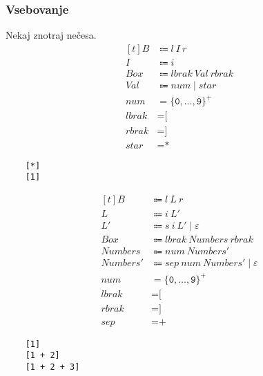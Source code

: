 \documentclass{report}
\newcommand{\Null}{\varepsilon}
\newcommand{\Char}[1]{\texttt{#1}}
\newcommand{\Spc}{\ }
\newcommand{\Union}{\mathrel{|}}
\newcommand{\KleenePlus}[1]{#1^+}
\newcommand{\Arrow}{\Coloneq}
\newcommand{\NT}[1]{{#1}}
\newcommand{\T}[1]{{#1}}
\begin{document}
    \subsubsection{Vsebovanje}
    Nekaj znotraj nečesa.
    \begin{equation*}
      \begin{aligned}[t]
        \NT{B} &\Arrow \T{l} \Spc \T{I} \Spc \T{r}\\
        \NT{I} &\Arrow \T{i}\\[1em]
        \NT{Box} &\Arrow \T{lbrak} \Spc \NT{Val} \Spc \T{rbrak}\\
        \NT{Val} &\Arrow \T{num} \Union \T{star}\\[1em]
        \T{num} &= \KleenePlus{\{\Char{0}, \dots, \Char{9}\}}\\
        \T{lbrak} &= \Char{[}\\
        \T{rbrak} &= \Char{]}\\
        \T{star} &= \Char{*}
      \end{aligned}
    \end{equation*}
    \begin{lstlisting}
    [*]
    [1]
    \end{lstlisting}

    \begin{equation*}
      \begin{aligned}[t]
        \NT{B} &\Arrow \T{l} \Spc \T{L} \Spc \T{r}\\
        \NT{L} &\Arrow \T{i} \Spc \NT{L'}\\
        \NT{L'} &\Arrow \T{s} \Spc \T{i} \Spc \NT{L'} \Union \Null\\[1em]
        \NT{Box} &\Arrow \T{lbrak} \Spc \NT{Numbers} \Spc \T{rbrak}\\
        \NT{Numbers} &\Arrow \T{num} \Spc \NT{Numbers'}\\
        \NT{Numbers'} &\Arrow \T{sep} \Spc \T{num} \Spc \NT{Numbers'} \Union \Null\\[1em]
        \T{num} &= \KleenePlus{\{\Char{0}, \dots, \Char{9}\}}\\
        \T{lbrak} &= \Char{[}\\
        \T{rbrak} &= \Char{]}\\
        \T{sep} &= \Char{+}
      \end{aligned}
    \end{equation*}
    \begin{lstlisting}
    [1]
    [1 + 2]
    [1 + 2 + 3]
    \end{lstlisting}
\end{document}
